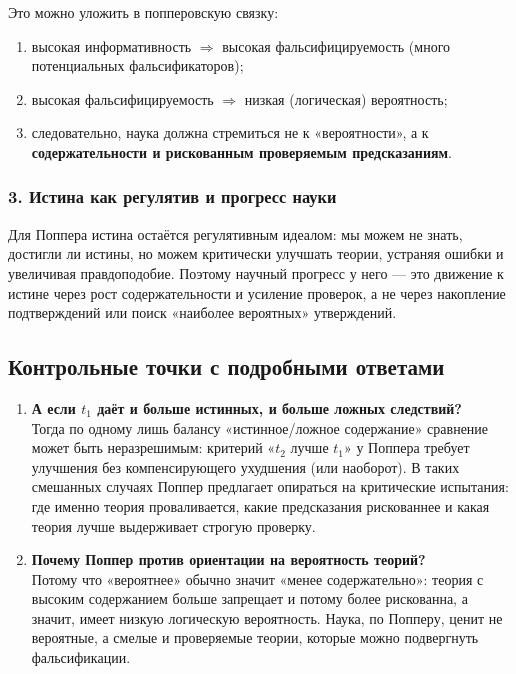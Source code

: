 \documentclass[a4paper,12pt]{article}
\begin{document}
Это можно уложить в попперовскую связку:
\begin{enumerate}
    \item высокая информативность $\Rightarrow$ высокая фальсифицируемость (много потенциальных фальсификаторов);
    \item высокая фальсифицируемость $\Rightarrow$ низкая (логическая) вероятность;
    \item следовательно, наука должна стремиться не к «вероятности», а к \textbf{содержательности и рискованным проверяемым предсказаниям}.
\end{enumerate}

\subsubsection*{3. Истина как регулятив и прогресс науки}

Для Поппера истина остаётся регулятивным идеалом: мы можем не знать, достигли ли истины, но можем критически улучшать теории, устраняя ошибки и увеличивая правдоподобие. Поэтому научный прогресс у него --- это движение к истине через рост содержательности и усиление проверок, а не через накопление подтверждений или поиск «наиболее вероятных» утверждений.

\subsection{Контрольные точки с подробными ответами}

\begin{enumerate}
    \item \textbf{А если $t_1$ даёт и больше истинных, и больше ложных следствий?}\\
    Тогда по одному лишь балансу «истинное/ложное содержание» сравнение может быть неразрешимым: критерий «$t_2$ лучше $t_1$» у Поппера требует улучшения без компенсирующего ухудшения (или наоборот). В таких смешанных случаях Поппер предлагает опираться на критические испытания: где именно теория проваливается, какие предсказания рискованнее и какая теория лучше выдерживает строгую проверку.
    \item \textbf{Почему Поппер против ориентации на вероятность теорий?}\\
    Потому что «вероятнее» обычно значит «менее содержательно»: теория с высоким содержанием больше запрещает и потому более рискованна, а значит, имеет низкую логическую вероятность. Наука, по Попперу, ценит не вероятные, а смелые и проверяемые теории, которые можно подвергнуть фальсификации.
\end{enumerate}
\end{document}
